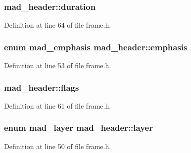 \subsubsection[{\texorpdfstring{duration}{duration}}]{ mad\+\_\+header\+::duration}\hypertarget{structmad__header_a44026fde9a7e3bef31a901c3ae5e1268}{}\label{structmad__header_a44026fde9a7e3bef31a901c3ae5e1268}


Definition at line 64 of file frame.\+h.

\subsubsection[{\texorpdfstring{emphasis}{emphasis}}]{\setlength{\rightskip}{0pt plus 5cm}enum {\bf mad\+\_\+emphasis} mad\+\_\+header\+::emphasis}\hypertarget{structmad__header_a355a4e10075f8304c7533998bef268a2}{}\label{structmad__header_a355a4e10075f8304c7533998bef268a2}


Definition at line 53 of file frame.\+h.

\subsubsection[{\texorpdfstring{flags}{flags}}]{ mad\+\_\+header\+::flags}\hypertarget{structmad__header_ac7b0399dfabb2192aa1ed7ef07a7c7a7}{}\label{structmad__header_ac7b0399dfabb2192aa1ed7ef07a7c7a7}


Definition at line 61 of file frame.\+h.

\subsubsection[{\texorpdfstring{layer}{layer}}]{\setlength{\rightskip}{0pt plus 5cm}enum {\bf mad\+\_\+layer} mad\+\_\+header\+::layer}\hypertarget{structmad__header_a69ea17540b7b9292a37b8dd86b9d7787}{}\label{structmad__header_a69ea17540b7b9292a37b8dd86b9d7787}


Definition at line 50 of file frame.\+h.

